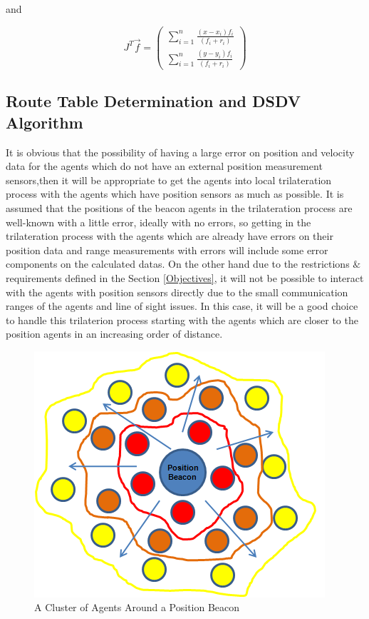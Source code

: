 and 

\begin{equation}
J^T\vec{f} = \left(\begin{matrix}
\sum_{i=1}^{n}\frac{(x-x_i)f_i}{(f_i+r_i)} \\
\sum_{i=1}^{n}\frac{(y-y_i)f_i}{(f_i+r_i)}
\end{matrix}\right)
\end{equation}
	
	
\subsection{ Route Table Determination and  DSDV Algorithm}
It is obvious that the possibility of having a large error on position and velocity data for the agents which do not have an external position measurement sensors,then it will be appropriate to get the agents into local trilateration process with the agents which have position sensors as much as possible. It is assumed that the positions of the beacon agents in the trilateration process are well-known with a little error, ideally with no errors, so getting in the trilateration process with the agents which are already have errors on their position data and range measurements with errors will include some error components on the calculated datas. On the other hand due to the restrictions $\&$ requirements defined in the Section \ref{Objectives}, it will not be possible to interact with the agents with position sensors directly due to the small communication ranges of the agents and line of sight issues. In this case, it will be a good choice to handle this trilaterion process starting with the agents which are closer to the position agents in an increasing order of distance.

\begin{figure}[H] 
\caption{A Cluster of Agents Around a Position Beacon} \label{position_beacon}
\centering
\includegraphics[scale = 0.65]{position_beacon}
\end{figure}

